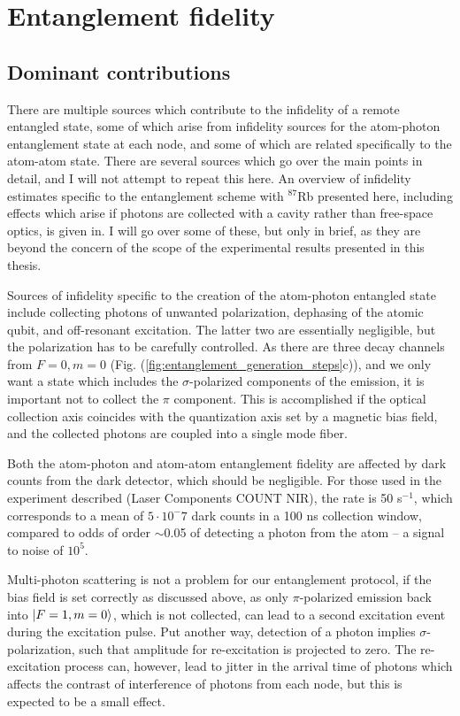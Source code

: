 \section{Entanglement fidelity}

\subsection{Dominant contributions}

There are multiple sources which contribute to the infidelity of a remote entangled state, some of which arise from infidelity sources for the atom-photon entanglement state at each node, and some of which are related specifically to the atom-atom state. There are several sources which go over the main points in detail, and I will not attempt to repeat this here. An overview of infidelity estimates specific to the entanglement scheme with $^{87}$Rb presented here, including effects which arise if photons are collected with a cavity rather than free-space optics, is given in\cite{Young2022}. I will go over some of these, but only in brief, as they are beyond the concern of the scope of the experimental results presented in this thesis.

Sources of infidelity specific to the creation of the atom-photon entangled state include collecting photons of unwanted polarization, dephasing of the atomic qubit, and off-resonant excitation. The latter two are essentially negligible, but the polarization has to be carefully controlled. As there are three decay channels from $F=0, m=0$ (Fig. (\ref{fig:entanglement_generation_steps}c)), and we only want a state which includes the $\sigma$-polarized components of the emission, it is important not to collect the $\pi$ component. This is accomplished if the optical collection axis coincides with the quantization axis set by a magnetic bias field, and the collected photons are coupled into a single mode fiber.

Both the atom-photon and atom-atom entanglement fidelity are affected by dark counts from the dark detector, which should be negligible. For those used in the experiment described (Laser Components COUNT NIR), the rate is 50 s$^{-1}$, which corresponds to a mean of $5\cdot 10^-7$ dark counts in a 100 ns collection window, compared to odds of order $\sim$0.05 of detecting a photon from the atom -- a signal to noise of $10^5$.

Multi-photon scattering is not a problem for our entanglement protocol, if the bias field is set correctly as discussed above, as only $\pi$-polarized emission back into $\ket{F=1,m=0}$, which is not collected, can lead to a second excitation event during the excitation pulse. Put another way, detection of a photon implies $\sigma$-polarization, such that amplitude for re-excitation is projected to zero. The re-excitation process can, however, lead to jitter in the arrival time of photons which affects the contrast of interference of photons from each node, but this is expected to be a small effect.

